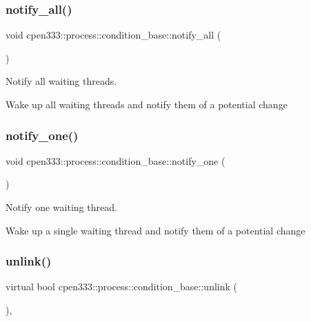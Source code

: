 \subsubsection{\texorpdfstring{notify\+\_\+all()}{notify\_all()}}
{\footnotesize\ttfamily void cpen333\+::process\+::condition\+\_\+base\+::notify\+\_\+all (\begin{DoxyParamCaption}{ }\end{DoxyParamCaption})\hspace{0.3cm}{\ttfamily [inline]}}



Notify all waiting threads. 

Wake up all waiting threads and notify them of a potential change \mbox{\label{classcpen333_1_1process_1_1condition__base_a990220c8ee064b3d494cdbf238ceb73e}} 
\subsubsection{\texorpdfstring{notify\+\_\+one()}{notify\_one()}}
{\footnotesize\ttfamily void cpen333\+::process\+::condition\+\_\+base\+::notify\+\_\+one (\begin{DoxyParamCaption}{ }\end{DoxyParamCaption})\hspace{0.3cm}{\ttfamily [inline]}}



Notify one waiting thread. 

Wake up a single waiting thread and notify them of a potential change \mbox{\label{classcpen333_1_1process_1_1condition__base_acd6d0b53a828aa161ccad06885eaa15c}} 
\subsubsection{\texorpdfstring{unlink()}{unlink()}\hspace{0.1cm}{\footnotesize\ttfamily [1/2]}}
{\footnotesize\ttfamily virtual bool cpen333\+::process\+::condition\+\_\+base\+::unlink (\begin{DoxyParamCaption}{ }\end{DoxyParamCaption})\hspace{0.3cm}{\ttfamily [inline]}, {\ttfamily [virtual]}}



